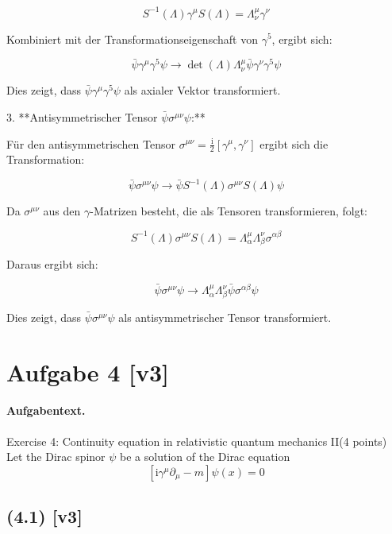 \documentclass[11pt,a4paper]{article}
\begin{document}
\[
S^{-1}(\Lambda) \gamma^\mu S(\Lambda) = \Lambda_\nu^\mu \gamma^\nu
\]

Kombiniert mit der Transformationseigenschaft von \(\gamma^5\), ergibt sich:

\[
\bar{\psi} \gamma^\mu \gamma^5 \psi \rightarrow \operatorname{det}(\Lambda) \Lambda_\nu^\mu \bar{\psi} \gamma^\nu \gamma^5 \psi
\]

Dies zeigt, dass \(\bar{\psi} \gamma^\mu \gamma^5 \psi\) als axialer Vektor transformiert.

3. **Antisymmetrischer Tensor \(\bar{\psi} \sigma^{\mu \nu} \psi\):**

Für den antisymmetrischen Tensor \(\sigma^{\mu \nu} = \frac{\mathrm{i}}{2} [\gamma^\mu, \gamma^\nu]\) ergibt sich die Transformation:

\[
\bar{\psi} \sigma^{\mu \nu} \psi \rightarrow \bar{\psi} S^{-1}(\Lambda) \sigma^{\mu \nu} S(\Lambda) \psi
\]

Da \(\sigma^{\mu \nu}\) aus den \(\gamma\)-Matrizen besteht, die als Tensoren transformieren, folgt:

\[
S^{-1}(\Lambda) \sigma^{\mu \nu} S(\Lambda) = \Lambda_\alpha^\mu \Lambda_\beta^\nu \sigma^{\alpha \beta}
\]

Daraus ergibt sich:

\[
\bar{\psi} \sigma^{\mu \nu} \psi \rightarrow \Lambda_\alpha^\mu \Lambda_\beta^\nu \bar{\psi} \sigma^{\alpha \beta} \psi
\]

Dies zeigt, dass \(\bar{\psi} \sigma^{\mu \nu} \psi\) als antisymmetrischer Tensor transformiert.


\section*{Aufgabe 4 [v3]}
\paragraph{Aufgabentext.}
Exercise 4: Continuity equation in relativistic quantum mechanics II(4 points) Let the Dirac spinor $\psi$ be a solution of the Dirac equation
$$
\left[\mathrm{i} \gamma^\mu \partial_\mu-m\right] \psi(x)=0
$$

\subsection*{(4.1) [v3]}
\end{document}
